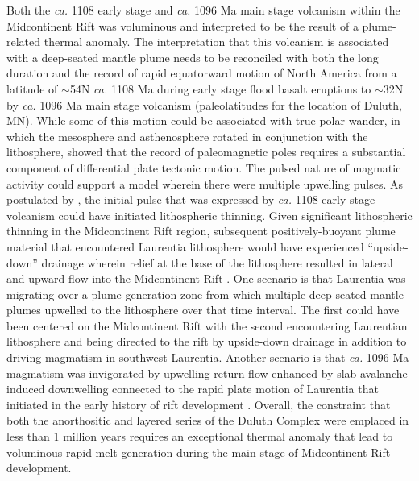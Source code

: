 \documentclass[11pt,letterpaper]{article}
\begin{document}
Both the \textit{ca.} 1108 early stage and \textit{ca.} 1096 Ma main stage volcanism within the Midcontinent Rift was voluminous and interpreted to be the result of a plume-related thermal anomaly. The interpretation that this volcanism is associated with a deep-seated mantle plume needs to be reconciled with both the long duration and the record of rapid equatorward motion of North America from a latitude of $\sim$54\textdegree N \textit{ca.} 1108 Ma during early stage flood basalt eruptions to $\sim$32\textdegree N by \textit{ca.} 1096 Ma main stage volcanism (paleolatitudes for the location of Duluth, MN). While some of this motion could be associated with true polar wander, in which the mesosphere and asthenosphere rotated in conjunction with the lithosphere, \cite{Swanson-Hysell2019a} showed that the record of paleomagnetic poles requires a substantial component of differential plate tectonic motion. The pulsed nature of magmatic activity could support a model wherein there were multiple upwelling pulses. As postulated by \cite{Cannon1992a}, the initial pulse that was expressed by \textit{ca.} 1108 early stage volcanism could have initiated lithospheric thinning. Given significant lithospheric thinning in the Midcontinent Rift region, subsequent positively-buoyant plume material that encountered Laurentia lithosphere would have experienced ``upside-down'' drainage wherein relief at the base of the lithosphere resulted in lateral and upward flow into the Midcontinent Rift \citep{Sleep1997a, Swanson-Hysell2014b}. One scenario is that Laurentia was migrating over a plume generation zone \citep{Burke2008a} from which multiple deep-seated mantle plumes upwelled to the lithosphere over that time interval. The first could have been centered on the Midcontinent Rift with the second encountering Laurentian lithosphere and being directed to the rift by upside-down drainage in addition to driving magmatism in southwest Laurentia. Another scenario is that \textit{ca.} 1096 Ma magmatism was invigorated by upwelling return flow enhanced by slab avalanche induced downwelling connected to the rapid plate motion of Laurentia that initiated in the early history of rift development \citep{Swanson-Hysell2019a}. Overall, the constraint that both the anorthositic and layered series of the Duluth Complex were emplaced in less than 1 million years requires an exceptional thermal anomaly that lead to voluminous rapid melt generation during the main stage of Midcontinent Rift development.

\end{document}
